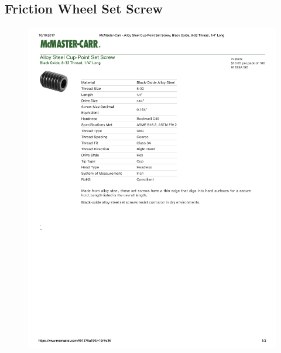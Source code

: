 \documentclass[../main.tex]{subfiles}
\begin{document}
\subsection{Friction Wheel Set Screw \cite{SetScrews}} \label{SetScrews}
\begin{figure}[H]
	\centering
	\includegraphics[width=\textwidth]{img/specs/Set-Screw.pdf}
\end{figure}

\end{document}
